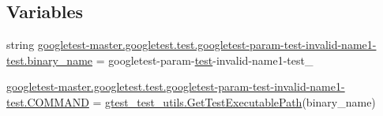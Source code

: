 \subsection*{Variables}
\begin{DoxyCompactItemize}
\item 
string \mbox{\hyperlink{namespacegoogletest-master_1_1googletest_1_1test_1_1googletest-param-test-invalid-name1-test_a96c453764fc603af54ac5e4361cde904}{googletest-\/master.\+googletest.\+test.\+googletest-\/param-\/test-\/invalid-\/name1-\/test.\+binary\+\_\+name}} = \textquotesingle{}googletest-\/param-\/\mbox{\hyperlink{_mutual_8h_a707ee03719e99670bf6cfdfd897b8456}{test}}-\/invalid-\/name1-\/test\+\_\+\textquotesingle{}
\item 
\mbox{\hyperlink{namespacegoogletest-master_1_1googletest_1_1test_1_1googletest-param-test-invalid-name1-test_a4e4bcb8d4a33cff12fb8b3b99ce69f5d}{googletest-\/master.\+googletest.\+test.\+googletest-\/param-\/test-\/invalid-\/name1-\/test.\+C\+O\+M\+M\+A\+ND}} = \mbox{\hyperlink{namespacegtest__test__utils_a89ed3717984a80ffbb7a9c92f71b86a2}{gtest\+\_\+test\+\_\+utils.\+Get\+Test\+Executable\+Path}}(binary\+\_\+name)
\end{DoxyCompactItemize}
